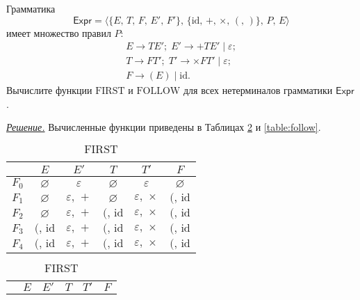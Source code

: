 \documentclass[10pt]{article}
\newcounter{pr} \setcounter{pr}{0}
\newenvironment{sol}
  {\par
   {\itshape \underline{Решение.}}}
  {}
\newcommand{\eps}{\varepsilon}
\renewcommand{\emptyset}{\varnothing}
\newcommand{\id}{\mathrm{id}}
\newcommand{\first}{\mathrm{FIRST}}
\newcommand{\follow}{\mathrm{FOLLOW}}
\begin{document}
  \title{\ptitle}
  \author{\pauthor, \pgroup}
  \date{\pdate}
  \maketitle
  \thispagestyle{fancytitlepage}
  \begin{pr}
    Грамматика
    \[
      \mathsf{Expr} = \Big\langle
        \big\{ E,\, T,\, F,\, E',\, F' \big\},\,
        \big\{ \id,\, +,\, \times,\, (,\, ) \big\},\, P,\, E
      \Big\rangle
    \] имеет множество правил $P:$
    \begin{gather*}
      E \to TE';\; E' \to + TE' \mid \eps; \\
      T \to FT';\; T' \to \times FT' \mid \eps; \\
      F \to (E) \mid \id.
    \end{gather*}
    Вычислите функции $\first$ и $\follow$ для всех нетерминалов грамматики
    $\mathsf{Expr}$.
    \begin{sol}
      Вычисленные функции приведены в Таблицах \ref{table:first} и
      \ref{table:follow}.
      \begin{table}[ht!]
        \parbox{.45\linewidth}{
          \centering
          \begin{tabular}{c|c|c|c|c|c}
                  & $E$         & $E'$        & $T$         & $T'$             & $F$         \\
            \hline
            $F_0$ & $\emptyset$ & $\eps$      & $\emptyset$ & $\eps$           & $\emptyset$ \\
            \hline
            $F_1$ & $\emptyset$ & $\eps,\, +$ & $\emptyset$ & $\eps,\, \times$ & $(,\, \id$  \\
            \hline
            $F_2$ & $\emptyset$ & $\eps,\, +$ & $(,\, \id$  & $\eps,\, \times$ & $(,\, \id$  \\
            \hline
            $F_3$ & $(,\, \id$  & $\eps,\, +$ & $(,\, \id$  & $\eps,\, \times$ & $(,\, \id$  \\
            \hline
            $F_4$ & $(,\, \id$  & $\eps,\, +$ & $(,\, \id$  & $\eps,\, \times$ & $(,\, \id$  \\
          \end{tabular}
          \caption{$\first$}
          \label{table:first}
        }
        \hfill
        \parbox{.45\linewidth}{
          \centering
          \begin{tabular}{c|c|c|c|c|c}
                  & $E$        & $E'$        & $T$            & $T'$           & $F$                      \\

\end{tabular}}
\end{table}
\end{sol}
\end{pr}
\end{document}
